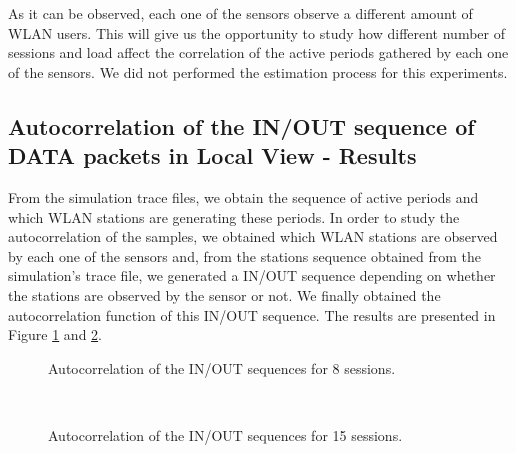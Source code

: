 As it can be observed, each one of the sensors observe a different amount of \acs{WLAN} users. This will give us the opportunity to study how different number of sessions and load affect the correlation of the active periods gathered by each one of the sensors. We did not performed the estimation process for this experiments.

\subsection{Autocorrelation of the IN/OUT sequence of DATA packets in Local View - Results} \label{sec:autocorrelation_lv_results}
From the simulation trace files, we obtain the sequence of active periods and which \acs{WLAN} stations are generating these periods. In order to study the autocorrelation of the samples, we obtained which \acs{WLAN} stations are observed by each one of the sensors and, from the stations sequence obtained from the simulation's trace file, we generated a IN/OUT sequence depending on whether the stations are observed by the sensor or not. We finally obtained the autocorrelation function of this IN/OUT sequence. The results are presented in Figure \ref{fig:autocorrelation_lv_8sessions_sensors} and \ref{fig:autocorrelation_lv_15sessions_sensors}.

\begin{figure}[h!]
	\centering
	\caption{Autocorrelation of the IN/OUT sequences for 8 sessions.}
	\label{fig:autocorrelation_lv_8sessions_sensors}
\end{figure}

\begin{figure}[h!]
	\centering
	\\
	\caption{Autocorrelation of the IN/OUT sequences for 15 sessions.}
	\label{fig:autocorrelation_lv_15sessions_sensors}
\end{figure}

